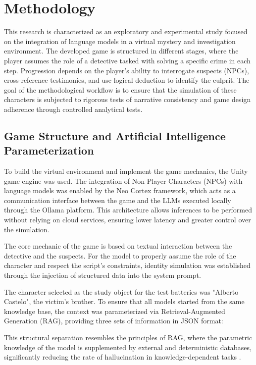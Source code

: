 \documentclass[12pt]{article}
\begin{document}
\section{Methodology}

This research is characterized as an exploratory and experimental study focused on the integration of language models in a virtual mystery and investigation environment. The developed game is structured in different stages, where the player assumes the role of a detective tasked with solving a specific crime in each step. Progression depends on the player's ability to interrogate suspects (NPCs), cross-reference testimonies, and use logical deduction to identify the culprit. The goal of the methodological workflow is to ensure that the simulation of these characters is subjected to rigorous tests of narrative consistency and game design adherence through controlled analytical tests.

\subsection{Game Structure and Artificial Intelligence Parameterization}

To build the virtual environment and implement the game mechanics, the Unity game engine was used. The integration of Non-Player Characters (NPCs) with language models was enabled by the Neo Cortex framework, which acts as a communication interface between the game and the LLMs executed locally through the Ollama platform. This architecture allows inferences to be performed without relying on cloud services, ensuring lower latency and greater control over the simulation.

The core mechanic of the game is based on textual interaction between the detective and the suspects. For the model to properly assume the role of the character and respect the script's constraints, identity simulation was established through the injection of structured data into the system prompt.

The character selected as the study object for the test batteries was "Alberto Castelo", the victim's brother. To ensure that all models started from the same knowledge base, the context was parameterized via Retrieval-Augmented Generation (RAG), providing three sets of information in JSON format:

This structural separation resembles the principles of RAG, where the parametric knowledge of the model is supplemented by external and deterministic databases, significantly reducing the rate of hallucination in knowledge-dependent tasks \cite{lewis2020retrieval}.
\end{document}
